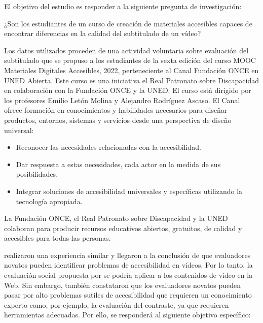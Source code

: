 \documentclass[
  12pt,
  a4paper,
  extrafontsizes,
  onecolumn,
  openright,
  table]{memoir}
\providecommand{\tightlist}{%
  \setlength{\itemsep}{0pt}\setlength{\parskip}{0pt}}\usepackage{longtable,booktabs,array}
\begin{document}
El objetivo del estudio es responder a la siguiente pregunta de
investigación:

\begin{tcolorbox}[enhanced jigsaw, opacitybacktitle=0.6, rightrule=.15mm, bottomtitle=1mm, opacityback=0, bottomrule=.15mm, arc=.35mm, colback=white, titlerule=0mm, colbacktitle=quarto-callout-note-color!10!white, toptitle=1mm, coltitle=black, leftrule=.75mm, breakable, title=\textcolor{quarto-callout-note-color}{\faInfo}\hspace{0.5em}{Pregunta de investigación}, toprule=.15mm, colframe=quarto-callout-note-color-frame, left=2mm]

¿Son los estudiantes de un curso de creación de materiales accesibles
capaces de encontrar diferencias en la calidad del subtitulado de un
vídeo?

\end{tcolorbox}

Los datos utilizados proceden de una actividad voluntaria sobre
evaluación del subtitulado que se propuso a los estudiantes de la sexta
edición del curso MOOC Materiales Digitales Accesibles, 2022,
perteneciente al Canal Fundación ONCE en UNED Abierta. Este curso es una
iniciativa el Real Patronato sobre Discapacidad en colaboración con la
Fundación ONCE y la UNED. El curso está dirigido por los profesores
Emilio Letón Molina y Alejandro Rodríguez Ascaso. El Canal ofrece
formación en conocimientos y habilidades necesarios para diseñar
productos, entornos, sistemas y servicios desde una perspectiva de
diseño universal:

\begin{itemize}
\tightlist
\item
  Reconocer las necesidades relacionadas con la accesibilidad.
\item
  Dar respuesta a estas necesidades, cada actor en la medida de sus
  posibilidades.
\item
  Integrar soluciones de accesibilidad universales y específicas
  utilizando la tecnología apropiada.
\end{itemize}

La Fundación ONCE, el Real Patronato sobre Discapacidad y la UNED
colaboran para producir recursos educativos abiertos, gratuitos, de
calidad y accesibles para todas las personas.

\textcite{jperez2} realizaron una experiencia similar y llegaron a la
conclusión de que evaluadores novatos pueden identificar problemas de
accesibilidad en vídeos. Por lo tanto, la evaluación social propuesta
por \textcite{kawanaka2008} se podría aplicar a los contenidos de video
en la Web. Sin embargo, también constataron que los evaluadores novatos
pueden pasar por alto problemas sutiles de accesibilidad que requieren
un conocimiento experto como, por ejemplo, la evaluación del contraste,
ya que requieren herramientas adecuadas. Por ello, se responderá al
siguiente objetivo específico:
\end{document}
